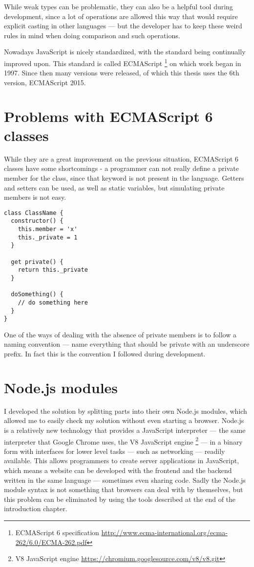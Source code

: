 While weak types can be problematic, they can also be a helpful tool during development, since a lot of operations are allowed this way that would require explicit casting in other languages --- but the developer has to keep these weird rules in mind when doing comparison and such operations.

Nowadays JavaScript is nicely standardized, with the standard being continually improved upon. This standard is called ECMAScript \footnote{ECMAScript 6 specification \url{http://www.ecma-international.org/ecma-262/6.0/ECMA-262.pdf}} on which work began in 1997. Since then many versions were released, of which this thesis uses the 6th version, ECMAScript 2015.
\section{Problems with ECMAScript 6 classes}
While they are a great improvement on the previous situation, ECMAScript 6 classes have some shortcomings - a programmer can not really define a private member for the class, since that keyword is not present in the language. Getters and setters can be used, as well as static variables, but simulating private members is not easy.

\begin{lstlisting}[frame=single,float=!ht,caption="A typical class"]
class ClassName {
  constructor() {
    this.member = 'x'
    this._private = 1
  }
  
  get private() {
    return this._private
  }
  
  doSomething() {
    // do something here
  }
}
\end{lstlisting}

One of the ways of dealing with the absence of private members is to follow a naming convention --- name everything that should be private with an underscore prefix. In fact this is the convention I followed during development.
\section{Node.js modules}
I developed the solution by splitting parts into their own Node.js modules, which allowed me to easily check my solution without even starting a browser. Node.js is a relatively new technology that provides a JavaScript interpreter --- the same interpreter that Google Chrome uses, the V8 JavaScript engine \footnote{V8 JavaScript engine \url{https://chromium.googlesource.com/v8/v8.git}} --- in a binary form with interfaces for lower level tasks --- such as networking --- readily available. This allows programmers to create server applications in JavaScript, which means a website can be developed with the frontend and the backend written in the same language --- sometimes even sharing code. Sadly the Node.js module syntax is not something that browsers can deal with by themselves, but this problem can be eliminated by using the tools described at the end of the introduction chapter.